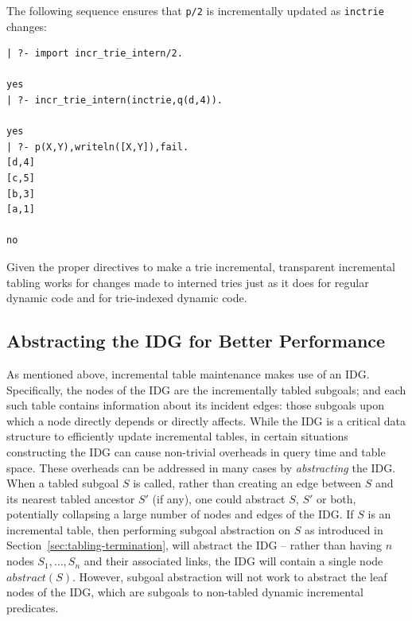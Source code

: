 %
The following sequence ensures that {\tt p/2} is incrementally updated
as {\tt inctrie} changes:
%
\begin{verbatim}
| ?- import incr_trie_intern/2.

yes
| ?- incr_trie_intern(inctrie,q(d,4)).

yes
| ?- p(X,Y),writeln([X,Y]),fail.
[d,4]
[c,5]
[b,3]
[a,1]

no
\end{verbatim}
%
Given the proper directives to make a trie incremental, transparent
incremental tabling works for changes made to interned tries just as
it does for regular dynamic code and for trie-indexed dynamic code.

\subsection{Abstracting the IDG for Better Performance} \label{sec:IDG-abs}
As mentioned above, incremental table maintenance makes use of an IDG.
Specifically, the nodes of the IDG are the incrementally tabled
subgoals; and each such table contains information about its incident
edges: those subgoals upon which a node directly depends or directly
affects.  While the IDG is a critical data structure to efficiently
update incremental tables, in certain situations constructing the IDG
can cause non-trivial overheads in query time and table space.  These
overheads can be addressed in many cases by {\em abstracting} the IDG.
When a tabled subgoal $S$ is called, rather than creating an edge
between $S$ and its nearest tabled ancestor $S'$ (if any), one could
abstract $S$, $S'$ or both, potentially collapsing a large number of
nodes and edges of the IDG.  If $S$ is an incremental table, then
performing subgoal abstraction on $S$ as introduced in
Section~\ref{sec:tabling-termination}, will abstract the IDG -- rather
than having $n$ nodes $S_1,\ldots,S_n$ and their associated links, the
IDG will contain a single node $abstract(S)$.  However, subgoal
abstraction will not work to abstract the leaf nodes of the IDG, which
are subgoals to non-tabled dynamic incremental predicates.

